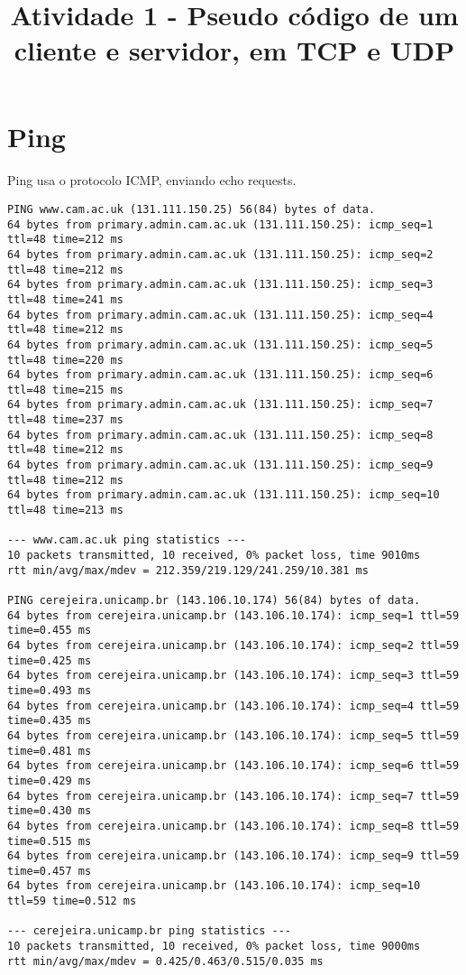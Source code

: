 \documentclass{article}
\title{Atividade 1 - Pseudo código de um cliente e servidor, em TCP e UDP}
\author{ }
\date{}
\begin{document}
\maketitle
\section*{Ping}
\paragraph{} Ping usa o protocolo ICMP, enviando echo requests.
\begin{verbatim}
PING www.cam.ac.uk (131.111.150.25) 56(84) bytes of data.
64 bytes from primary.admin.cam.ac.uk (131.111.150.25): icmp_seq=1 ttl=48 time=212 ms
64 bytes from primary.admin.cam.ac.uk (131.111.150.25): icmp_seq=2 ttl=48 time=212 ms
64 bytes from primary.admin.cam.ac.uk (131.111.150.25): icmp_seq=3 ttl=48 time=241 ms
64 bytes from primary.admin.cam.ac.uk (131.111.150.25): icmp_seq=4 ttl=48 time=212 ms
64 bytes from primary.admin.cam.ac.uk (131.111.150.25): icmp_seq=5 ttl=48 time=220 ms
64 bytes from primary.admin.cam.ac.uk (131.111.150.25): icmp_seq=6 ttl=48 time=215 ms
64 bytes from primary.admin.cam.ac.uk (131.111.150.25): icmp_seq=7 ttl=48 time=237 ms
64 bytes from primary.admin.cam.ac.uk (131.111.150.25): icmp_seq=8 ttl=48 time=212 ms
64 bytes from primary.admin.cam.ac.uk (131.111.150.25): icmp_seq=9 ttl=48 time=212 ms
64 bytes from primary.admin.cam.ac.uk (131.111.150.25): icmp_seq=10 ttl=48 time=213 ms

--- www.cam.ac.uk ping statistics ---
10 packets transmitted, 10 received, 0% packet loss, time 9010ms
rtt min/avg/max/mdev = 212.359/219.129/241.259/10.381 ms

PING cerejeira.unicamp.br (143.106.10.174) 56(84) bytes of data.
64 bytes from cerejeira.unicamp.br (143.106.10.174): icmp_seq=1 ttl=59 time=0.455 ms
64 bytes from cerejeira.unicamp.br (143.106.10.174): icmp_seq=2 ttl=59 time=0.425 ms
64 bytes from cerejeira.unicamp.br (143.106.10.174): icmp_seq=3 ttl=59 time=0.493 ms
64 bytes from cerejeira.unicamp.br (143.106.10.174): icmp_seq=4 ttl=59 time=0.435 ms
64 bytes from cerejeira.unicamp.br (143.106.10.174): icmp_seq=5 ttl=59 time=0.481 ms
64 bytes from cerejeira.unicamp.br (143.106.10.174): icmp_seq=6 ttl=59 time=0.429 ms
64 bytes from cerejeira.unicamp.br (143.106.10.174): icmp_seq=7 ttl=59 time=0.430 ms
64 bytes from cerejeira.unicamp.br (143.106.10.174): icmp_seq=8 ttl=59 time=0.515 ms
64 bytes from cerejeira.unicamp.br (143.106.10.174): icmp_seq=9 ttl=59 time=0.457 ms
64 bytes from cerejeira.unicamp.br (143.106.10.174): icmp_seq=10 ttl=59 time=0.512 ms

--- cerejeira.unicamp.br ping statistics ---
10 packets transmitted, 10 received, 0% packet loss, time 9000ms
rtt min/avg/max/mdev = 0.425/0.463/0.515/0.035 ms

\end{verbatim}
\end{document}
